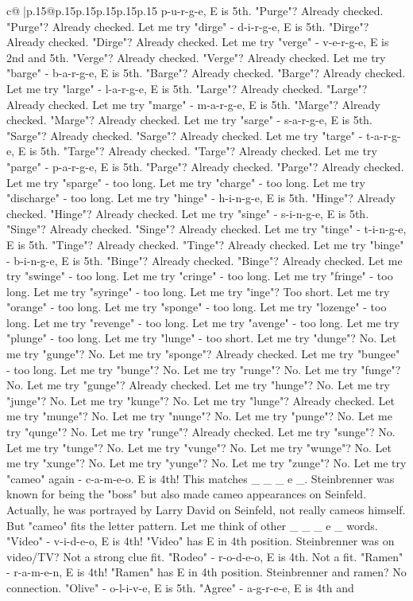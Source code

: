 \documentclass{article}
\begin{document}
{\begin{supertabular}{c@{$\;$}|p{.15\linewidth}@{}p{.15\linewidth}p{.15\linewidth}p{.15\linewidth}p{.15\linewidth}p{.15\linewidth}}
{{{p{-}u{-}r{-}g{-}e, E is 5th. "Purge"? Already checked. "Purge"? Already checked. Let me try "dirge" {-} d{-}i{-}r{-}g{-}e, E is 5th. "Dirge"? Already checked. "Dirge"? Already checked. Let me try "verge" {-} v{-}e{-}r{-}g{-}e, E is 2nd and 5th. "Verge"? Already checked. "Verge"? Already checked. Let me try "barge" {-} b{-}a{-}r{-}g{-}e, E is 5th. "Barge"? Already checked. "Barge"? Already checked. Let me try "large" {-} l{-}a{-}r{-}g{-}e, E is 5th. "Large"? Already checked. "Large"? Already checked. Let me try "marge" {-} m{-}a{-}r{-}g{-}e, E is 5th. "Marge"? Already checked. "Marge"? Already checked. Let me try "sarge" {-} s{-}a{-}r{-}g{-}e, E is 5th. "Sarge"? Already checked. "Sarge"? Already checked. Let me try "targe" {-} t{-}a{-}r{-}g{-}e, E is 5th. "Targe"? Already checked. "Targe"? Already checked. Let me try "parge" {-} p{-}a{-}r{-}g{-}e, E is 5th. "Parge"? Already checked. "Parge"? Already checked. Let me try "sparge" {-} too long. Let me try "charge" {-} too long. Let me try "discharge" {-} too long. Let me try "hinge" {-} h{-}i{-}n{-}g{-}e, E is 5th. "Hinge"? Already checked. "Hinge"? Already checked. Let me try "singe" {-} s{-}i{-}n{-}g{-}e, E is 5th. "Singe"? Already checked. "Singe"? Already checked. Let me try "tinge" {-} t{-}i{-}n{-}g{-}e, E is 5th. "Tinge"? Already checked. "Tinge"? Already checked. Let me try "binge" {-} b{-}i{-}n{-}g{-}e, E is 5th. "Binge"? Already checked. "Binge"? Already checked. Let me try "swinge" {-} too long. Let me try "cringe" {-} too long. Let me try "fringe" {-} too long. Let me try "syringe" {-} too long. Let me try "inge"? Too short. Let me try "orange" {-} too long. Let me try "sponge" {-} too long. Let me try "lozenge" {-} too long. Let me try "revenge" {-} too long. Let me try "avenge" {-} too long. Let me try "plunge" {-} too long. Let me try "lunge" {-} too short. Let me try "dunge"? No. Let me try "gunge"? No. Let me try "sponge"? Already checked. Let me try "bungee" {-} too long. Let me try "bunge"? No. Let me try "runge"? No. Let me try "funge"? No. Let me try "gunge"? Already checked. Let me try "hunge"? No. Let me try "junge"? No. Let me try "kunge"? No. Let me try "lunge"? Already checked. Let me try "munge"? No. Let me try "nunge"? No. Let me try "punge"? No. Let me try "qunge"? No. Let me try "runge"? Already checked. Let me try "sunge"? No. Let me try "tunge"? No. Let me try "vunge"? No. Let me try "wunge"? No. Let me try "xunge"? No. Let me try "yunge"? No. Let me try "zunge"? No. Let me try "cameo" again {-} c{-}a{-}m{-}e{-}o. E is 4th! This matches \_ \_ \_ e \_. Steinbrenner was known for being the "boss" but also made cameo appearances on Seinfeld. Actually, he was portrayed by Larry David on Seinfeld, not really cameos himself. But "cameo" fits the letter pattern. Let me think of other \_ \_ \_ e \_ words. "Video" {-} v{-}i{-}d{-}e{-}o, E is 4th! "Video" has E in 4th position. Steinbrenner was on video/TV? Not a strong clue fit. "Rodeo" {-} r{-}o{-}d{-}e{-}o, E is 4th. Not a fit. "Ramen" {-} r{-}a{-}m{-}e{-}n, E is 4th! "Ramen" has E in 4th position. Steinbrenner and ramen? No connection. "Olive" {-} o{-}l{-}i{-}v{-}e, E is 5th. "Agree" {-} a{-}g{-}r{-}e{-}e, E is 4th and }}}
\end{supertabular}}
\end{document}
